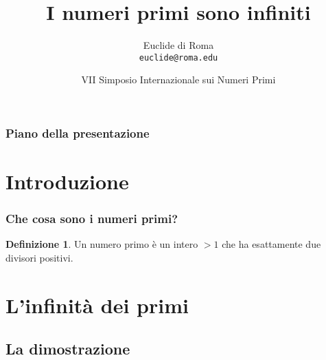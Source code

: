 \documentclass{beamer} %
\title{I numeri primi sono infiniti}
\author[Euclide]{Euclide di Roma\\\texttt{euclide@roma.edu}}
\date[VII SINP]{VII Simposio Internazionale sui Numeri Primi}
\institute[Roma]{Università di Roma}
\theoremstyle{definition}
\newtheorem{definizione}{Definizione}
\theoremstyle{plain}
\begin{document}

\titlepageframe %


\begin{frame}
  \frametitle{Piano della presentazione} %
  \tableofcontents %
\end{frame}




\section{Introduzione}

\begin{frame}
  \frametitle{Che cosa sono i numeri primi?} %
  \begin{definizione}
    Un \alert{numero primo} è un intero $>1$ che ha esattamente due divisori positivi.
  \end{definizione}
\end{frame}


\section{L'infinità dei primi}
\subsection{La dimostrazione}
\end{document}
